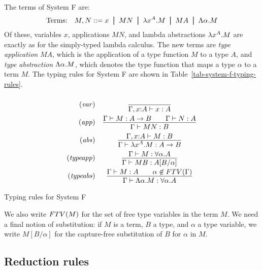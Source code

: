 \documentclass{article}
\begin{document}
The terms of System F are:
\[ \mbox{Terms:}\ssep M,N \bnf x \bor MN \bor \lamabs{x}{A}.M \bor MA
\bor \Lamabs{\alpha}.M
\]
Of these, variables $x$, applications $MN$, and lambda abstractions
$\lambda x^{A}.M$ are exactly as for the simply-typed lambda
calculus. The new terms are {\em type application} $MA$, which is the
application of a type function $M$ to a type $A$, and {\em type
  abstraction} $\Lambda\alpha.M$, which denotes the type function
that maps a type $\alpha$ to a term $M$. The typing rules for System F
are shown in Table~\ref{tab-system-f-typing-rules}.
\begin{table*}[tbp]
\[
\begin{array}{rc}
        \tjvar
&       \deriv{}{\Gamma,\typ{x}{ A}\tj x: A}
\nl     \tjapp
&       \deriv{\Gamma\tj M: A\to B\sep\Gamma\tj N: A}
                {\Gamma\tj MN: B}
\nl     \tjlam
&       \deriv{\Gamma,\typ{x}{ A}\tj M: B}
                {\Gamma\tj\lamabs{x}{A}.M: A\to B}
\nl     \tjApp
&       \deriv{\Gamma\tj M: \forall\alpha.A}
                {\Gamma\tj MB: A[B/\alpha]}
\nl     \tjLam
&       \deriv{\Gamma \tj M: A\sep \alpha\not\in\FTV{\Gamma}}
                {\Gamma\tj\Lamabs{\alpha}.M: \forall\alpha.A}
\end{array}
\]
\caption{Typing rules for System F}
\label{tab-system-f-typing-rules}
\end{table*}

We also write $FTV(M)$ for the set of free type variables in the term
$M$. We need a final notion of substitution: if $M$ is a term, $B$ a type,
and $\alpha$ a type variable, we write $M[B/\alpha]$ for the
capture-free substitution of $B$ for $\alpha$ in $M$. 

\subsection{Reduction rules}
\end{document}
